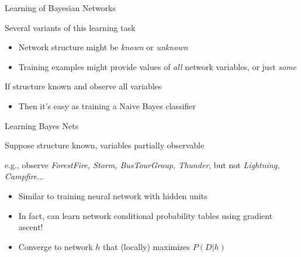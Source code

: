\documentclass[%
pdf,
colorBG,
slideColor,
tcrico,
]{prosper}
\begin{document}

\begin{slide}{Learning of Bayesian Networks   }  

Several variants of this learning task

\begin{itemize}
\item 
Network structure might be {\em known} or {\em unknown}
\item 
Training examples might provide values of {\em all} network variables, or just
{\em some}
\end{itemize}

If structure known and observe all variables
\begin{itemize} \item Then it's easy as training a Naive Bayes classifier \end{itemize}
\end{slide}


\begin{slide}{Learning Bayes Nets   }  

Suppose structure known, variables partially observable

e.g., observe {\em ForestFire, Storm, BusTourGroup, Thunder}, but not {\em
Lightning, Campfire}...

\begin{itemize}
\item Similar to training neural network with hidden units
\item In fact, can learn network conditional probability tables using gradient
ascent! 
\item Converge to network $h$ that (locally) maximizes $P(D|h)$
\end{itemize}
\end{slide}

\end{document}
